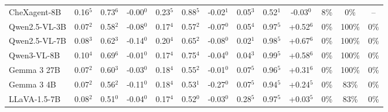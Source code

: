 \documentclass{article}
\begin{document}
\begin{table}[t]
{\begin{tabular}{l@{\hspace{3pt}}ccc@{\hspace{4pt}}ccc@{\hspace{4pt}}ccc@{\hspace{4pt}}ccc}
CheXagent-8B & \cellcolor{cfSage3}0.16$^{5}$ & \cellcolor{cfSage2}0.73$^{6}$ & \cellcolor{cfSlate1}-0.00$^{0}$ & \cellcolor{cfSage4}0.23$^{5}$ & \cellcolor{cfSage3}0.88$^{5}$ & \cellcolor{cfSlate1}-0.02$^{1}$ & \cellcolor{cfSage2}0.05$^{3}$ & \cellcolor{cfSage1}0.52$^{1}$ & \cellcolor{cfSlate2}-0.03$^{0}$ & \cellcolor{cfTerra2}8\% & \cellcolor{cfTerra1}0\% & -- \\
Qwen2.5-VL-3B & \cellcolor{cfSage2}0.07$^{2}$ & \cellcolor{cfSage1}0.58$^{2}$ & \cellcolor{cfSlate2}-0.08$^{0}$ & \cellcolor{cfSage3}0.17$^{4}$ & \cellcolor{cfSage1}0.57$^{2}$ & \cellcolor{cfSlate2}-0.07$^{0}$ & \cellcolor{cfSage1}0.05$^{4}$ & \cellcolor{cfSage4}0.97$^{5}$ & \cellcolor{cfTerra4}+0.52$^{6}$ & \cellcolor{cfTerra1}0\% & \cellcolor{cfTerra4}100\% & 0\% \\
Qwen2.5-VL-7B & \cellcolor{cfSage2}0.08$^{3}$ & \cellcolor{cfSage2}0.62$^{3}$ & \cellcolor{cfSlate3}-0.14$^{0}$ & \cellcolor{cfSage3}0.20$^{4}$ & \cellcolor{cfSage2}0.65$^{2}$ & \cellcolor{cfSlate2}-0.08$^{0}$ & \cellcolor{cfSage1}0.02$^{1}$ & \cellcolor{cfSage4}0.98$^{5}$ & \cellcolor{cfTerra4}+0.67$^{6}$ & \cellcolor{cfTerra1}0\% & \cellcolor{cfTerra4}100\% & 0\% \\
Qwen3-VL-8B & \cellcolor{cfSage2}0.10$^{4}$ & \cellcolor{cfSage2}0.69$^{6}$ & \cellcolor{cfSlate1}-0.01$^{0}$ & \cellcolor{cfSage3}0.17$^{4}$ & \cellcolor{cfSage2}0.75$^{4}$ & \cellcolor{cfSlate2}-0.04$^{0}$ & \cellcolor{cfSage1}0.04$^{3}$ & \cellcolor{cfSage4}0.99$^{5}$ & \cellcolor{cfTerra4}+0.58$^{6}$ & \cellcolor{cfTerra1}0\% & \cellcolor{cfTerra4}100\% & 0\% \\
Gemma 3 27B & \cellcolor{cfSage2}0.07$^{2}$ & \cellcolor{cfSage2}0.60$^{3}$ & \cellcolor{cfSlate2}-0.03$^{0}$ & \cellcolor{cfSage3}0.18$^{4}$ & \cellcolor{cfSage1}0.55$^{2}$ & \cellcolor{cfSlate1}-0.01$^{0}$ & \cellcolor{cfSage2}0.07$^{5}$ & \cellcolor{cfSage4}0.96$^{5}$ & \cellcolor{cfTerra4}+0.31$^{6}$ & \cellcolor{cfTerra1}0\% & \cellcolor{cfTerra4}100\% & 0\% \\
Gemma 3 4B & \cellcolor{cfSage2}0.07$^{2}$ & \cellcolor{cfSage1}0.56$^{2}$ & \cellcolor{cfSlate3}-0.11$^{0}$ & \cellcolor{cfSage3}0.18$^{4}$ & \cellcolor{cfSage1}0.53$^{1}$ & \cellcolor{cfSlate4}-0.27$^{0}$ & \cellcolor{cfSage2}0.07$^{5}$ & \cellcolor{cfSage4}0.94$^{5}$ & \cellcolor{cfTerra3}+0.24$^{5}$ & \cellcolor{cfTerra1}0\% & \cellcolor{cfTerra3}83\% & 0\% \\
LLaVA-1.5-7B & \cellcolor{cfSage2}0.08$^{2}$ & \cellcolor{cfSage1}0.51$^{0}$ & \cellcolor{cfSlate2}-0.04$^{0}$ & \cellcolor{cfSage3}0.17$^{4}$ & \cellcolor{cfSage1}0.52$^{0}$ & \cellcolor{cfSlate2}-0.03$^{0}$ & \cellcolor{cfSage4}0.28$^{5}$ & \cellcolor{cfSage4}0.97$^{5}$ & \cellcolor{cfTerra2}+0.03$^{5}$ & \cellcolor{cfTerra1}0\% & \cellcolor{cfTerra3}83\% & 0\% \\

\end{tabular}}
\end{table}
\end{document}
